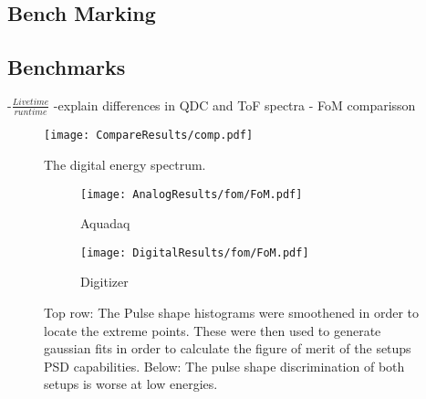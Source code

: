 \documentclass[main.tex]{subfiles}
\begin{document}
\subsection{Bench Marking}




\subsection{Benchmarks}
-$\frac{Livetime}{runtime}$
\newline-explain differences in QDC and ToF spectra
\newline- FoM comparisson
\begin{figure}[h]
    \centering
        \texttt{[image: CompareResults/comp.pdf]}
        \caption{The digital energy spectrum.}
    \label{fig:AD_comp}
\end{figure}

\begin{figure}[ht]
	\begin{subfigure}[b]{0.49\textwidth}
	    \centering
    	    \texttt{[image: AnalogResults/fom/FoM.pdf]}
        	\caption{Aquadaq}
	    \label{fig:fom_analog} 
	\end{subfigure}
	\begin{subfigure}[b]{0.49\textwidth}
    	\centering
        	\texttt{[image: DigitalResults/fom/FoM.pdf]}
        	\caption{Digitizer}
    	\label{fig:fom_digital} 
    \end{subfigure}
    \caption{Top row: The Pulse shape histograms were smoothened in order to locate the extreme points. These were then used to generate gaussian fits in order to calculate the figure of merit of the setups PSD capabilities. Below: The pulse shape discrimination of both setups is worse at low energies.}
\end{figure}
\end{document}
